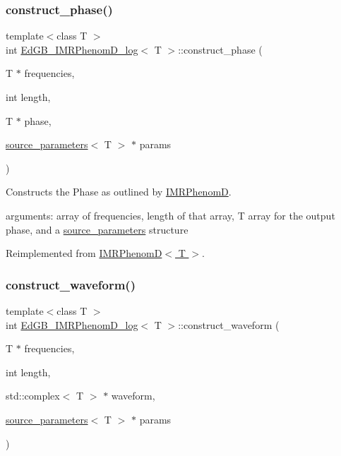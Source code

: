 \subsubsection{\texorpdfstring{construct\+\_\+phase()}{construct\_phase()}}
{\footnotesize\ttfamily template$<$class T $>$ \\
int \hyperlink{classEdGB__IMRPhenomD__log}{Ed\+G\+B\+\_\+\+I\+M\+R\+Phenom\+D\+\_\+log}$<$ T $>$\+::construct\+\_\+phase (\begin{DoxyParamCaption}\item[{T $\ast$}]{frequencies,  }\item[{int}]{length,  }\item[{T $\ast$}]{phase,  }\item[{\hyperlink{structsource__parameters}{source\+\_\+parameters}$<$ T $>$ $\ast$}]{params }\end{DoxyParamCaption})\hspace{0.3cm}{\ttfamily [virtual]}}



Constructs the Phase as outlined by \hyperlink{classIMRPhenomD}{I\+M\+R\+PhenomD}. 

arguments\+: array of frequencies, length of that array, T array for the output phase, and a \hyperlink{structsource__parameters}{source\+\_\+parameters} structure 

Reimplemented from \hyperlink{classIMRPhenomD_abcbaafd0dc4086d2abe1f5ce256908c2}{I\+M\+R\+Phenom\+D$<$ T $>$}.

\mbox{\label{classEdGB__IMRPhenomD__log_afbb021b8af2b53b51ca24d7c29c0d487}} 
\subsubsection{\texorpdfstring{construct\+\_\+waveform()}{construct\_waveform()}}
{\footnotesize\ttfamily template$<$class T $>$ \\
int \hyperlink{classEdGB__IMRPhenomD__log}{Ed\+G\+B\+\_\+\+I\+M\+R\+Phenom\+D\+\_\+log}$<$ T $>$\+::construct\+\_\+waveform (\begin{DoxyParamCaption}\item[{T $\ast$}]{frequencies,  }\item[{int}]{length,  }\item[{std\+::complex$<$ T $>$ $\ast$}]{waveform,  }\item[{\hyperlink{structsource__parameters}{source\+\_\+parameters}$<$ T $>$ $\ast$}]{params }\end{DoxyParamCaption})\hspace{0.3cm}{\ttfamily [virtual]}}



